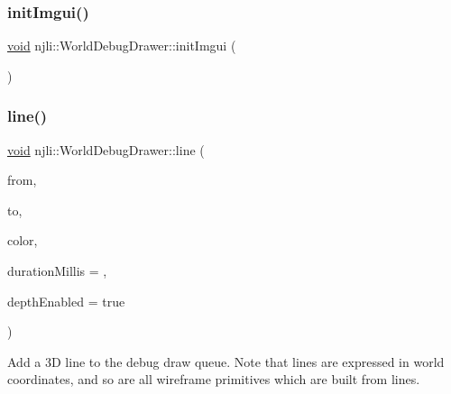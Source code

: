 \mbox{\label{classnjli_1_1_world_debug_drawer_aed4000f5c9f1a4b5be0fdd6b48e9d68e}} 
\subsubsection{\texorpdfstring{init\+Imgui()}{initImgui()}}
{\footnotesize\ttfamily \mbox{\hyperlink{_thread_8h_af1e856da2e658414cb2456cb6f7ebc66}{void}} njli\+::\+World\+Debug\+Drawer\+::init\+Imgui (\begin{DoxyParamCaption}{ }\end{DoxyParamCaption})\hspace{0.3cm}{\ttfamily [protected]}}

\mbox{\label{classnjli_1_1_world_debug_drawer_ab8577e1631222c8a64ba370b4e62daa6}} 
\subsubsection{\texorpdfstring{line()}{line()}}
{\footnotesize\ttfamily \mbox{\hyperlink{_thread_8h_af1e856da2e658414cb2456cb6f7ebc66}{void}} njli\+::\+World\+Debug\+Drawer\+::line (\begin{DoxyParamCaption}\item[{const bt\+Vector3 \&}]{from,  }\item[{const bt\+Vector3 \&}]{to,  }\item[{const bt\+Vector3 \&}]{color,  }\item[{int}]{duration\+Millis = {},  }\item[{bool}]{depth\+Enabled = {\ttfamily true} }\end{DoxyParamCaption})}

Add a 3D line to the debug draw queue. Note that lines are expressed in world coordinates, and so are all wireframe primitives which are built from lines.


